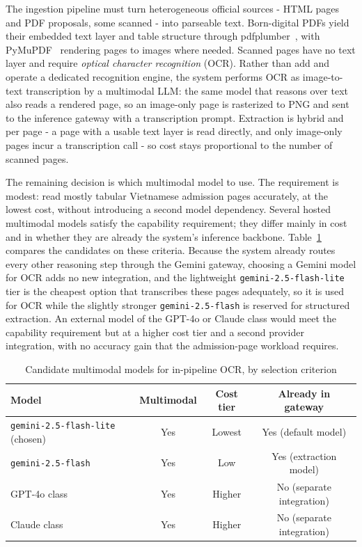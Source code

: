 \documentclass[../main.tex]{subfiles}
\begin{document}
The ingestion pipeline must turn heterogeneous official sources - \gls{HTML} pages and \gls{PDF} proposals, some scanned - into parseable text.
Born-digital \gls{PDF}s yield their embedded text layer and table structure through pdfplumber~\cite{pdfplumber}, with PyMuPDF~\cite{pymupdf} rendering pages to images where needed.
Scanned pages have no text layer and require \textit{optical character recognition} (\gls{OCR}).
Rather than add and operate a dedicated recognition engine, the system performs \gls{OCR} as image-to-text transcription by a multimodal \gls{LLM}: the same model that reasons over text also reads a rendered page, so an image-only page is rasterized to PNG and sent to the inference gateway with a transcription prompt.
Extraction is hybrid and per page - a page with a usable text layer is read directly, and only image-only pages incur a transcription call - so cost stays proportional to the number of scanned pages.

The remaining decision is which multimodal model to use.
The requirement is modest: read mostly tabular Vietnamese admission pages accurately, at the lowest cost, without introducing a second model dependency.
Several hosted multimodal models satisfy the capability requirement; they differ mainly in cost and in whether they are already the system's inference backbone.
Table~\ref{table:ocr-models} compares the candidates on these criteria.
Because the system already routes every other reasoning step through the Gemini gateway, choosing a Gemini model for \gls{OCR} adds no new integration, and the lightweight \texttt{gemini-2.5-flash-lite} tier is the cheapest option that transcribes these pages adequately, so it is used for \gls{OCR} while the slightly stronger \texttt{gemini-2.5-flash} is reserved for structured extraction.
An external model of the GPT-4o or Claude class would meet the capability requirement but at a higher cost tier and a second provider integration, with no accuracy gain that the admission-page workload requires.

\begin{table}[H]
    \centering
    \caption{Candidate multimodal models for in-pipeline \gls{OCR}, by selection criterion}
    \label{table:ocr-models}
    {\footnotesize
    \setlength{\tabcolsep}{5pt}
    \begin{tabular}{|p{4.5cm}|c|c|c|}
        \hline
        \textbf{Model} & \textbf{Multimodal} & \textbf{Cost tier} & \textbf{Already in gateway} \\
        \hline
        \texttt{gemini-2.5-flash-lite} (chosen) & Yes & Lowest & Yes (default model) \\
        \hline
        \texttt{gemini-2.5-flash} & Yes & Low & Yes (extraction model) \\
        \hline
        GPT-4o class~\cite{openai_models} & Yes & Higher & No (separate integration) \\
        \hline
        Claude class~\cite{anthropic_models} & Yes & Higher & No (separate integration) \\
        \hline
    \end{tabular}}
\end{table}
\end{document}
